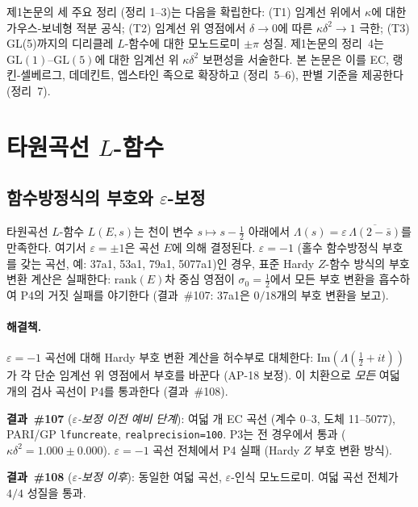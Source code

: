\documentclass[11pt, a4paper]{article}
\theoremstyle{plain}
\theoremstyle{definition}
\begin{document}
제1논문의 세 주요 정리 (정리 1--3)는 다음을 확립한다:
(T1) 임계선 위에서 $\kappa$에 대한 가우스-보네형 적분 공식;
(T2) 임계선 위 영점에서 $\delta\to 0$에 따른
$\kappa\delta^{2}\to 1$ 극한;
(T3) GL(5)까지의 디리클레 $L$-함수에 대한 모노드로미 $\pm\pi$ 성질.
제1논문의 정리~4는 $\mathrm{GL}(1)$--$\mathrm{GL}(5)$에 대한
임계선 위 $\kappa\delta^{2}$ 보편성을 서술한다.
본 논문은 이를 EC, 랭킨-셀베르그, 데데킨트, 엡스타인 족으로 확장하고
(정리~5--6), 판별 기준을 제공한다 (정리~7).


\section{타원곡선 $L$-함수}
\label{sec:ec}

\subsection{함수방정식의 부호와 $\varepsilon$-보정}
\label{ssec:epsilon}

타원곡선 $L$-함수 $L(E,s)$는 천이 변수 $s\mapsto s-\tfrac{1}{2}$ 아래에서
$\Lambda(s) = \varepsilon\,\overline{\Lambda(2-\bar{s})}$를 만족한다.
여기서 $\varepsilon=\pm 1$은 곡선 $E$에 의해 결정된다.
$\varepsilon=-1$ (홀수 함수방정식 부호를 갖는 곡선,
예: 37a1, 53a1, 79a1, 5077a1)인 경우,
표준 Hardy $Z$-함수 방식의 부호 변환 계산은 실패한다:
$\text{rank}(E)$차 중심 영점이
$\sigma_{0}=\tfrac{1}{2}$에서 모든 부호 변환을 흡수하여
P4의 거짓 실패를 야기한다
(결과~\#107: 37a1은 $0/18$개의 부호 변환을 보고).

\paragraph{해결책.}
$\varepsilon=-1$ 곡선에 대해 Hardy 부호 변환 계산을
허수부로 대체한다: $\mathrm{Im}(\Lambda(\tfrac{1}{2}+it))$가
각 단순 임계선 위 영점에서 부호를 바꾼다 (AP-18 보정).
이 치환으로 \textit{모든} 여덟 개의 검사 곡선이 P4를 통과한다
(결과~\#108).

\medskip
\noindent
\textbf{결과~\#107} (\textit{$\varepsilon$-보정 이전 예비 단계}):
여덟 개 EC 곡선 (계수 0--3, 도체 11--5077),
PARI/GP \texttt{lfuncreate}, \texttt{realprecision=100}.
P3는 전 경우에서 통과 ($\kappa\delta^{2}=1.000\pm0.000$).
$\varepsilon=-1$ 곡선 전체에서 P4 실패 (Hardy $Z$ 부호 변환 방식).

\medskip
\noindent
\textbf{결과~\#108} (\textit{$\varepsilon$-보정 이후}):
동일한 여덟 곡선, $\varepsilon$-인식 모노드로미.
여덟 곡선 전체가 $4/4$ 성질을 통과.
\end{document}
